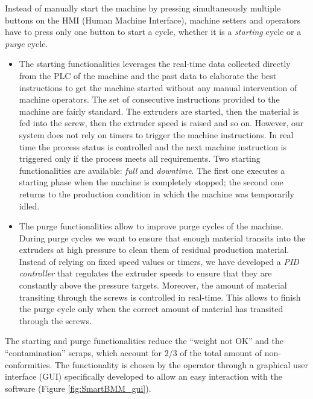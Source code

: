 Instead of manually start the machine by pressing simultaneously multiple buttons on the HMI (Human Machine Interface), machine setters and operators have to press only one button to start a cycle, whether it is a \textit{starting} cycle or a \textit{purge} cycle.  

\begin{itemize}
    \item The starting functionalities leverages the real-time data collected directly from the PLC of the machine and the past data to elaborate the best instructions to get the machine started without any manual intervention of machine operators. The set of consecutive instructions provided to the machine are fairly standard. The extruders are started, then the material is fed into the screw, then the extruder speed is raised and so on. However, our system does not rely on timers to trigger the machine instructions. In real time the process status is controlled and the next machine instruction is triggered only if the process meets all requirements.
    Two starting functionalities are available: \textit{full} and \textit{downtime}. The first one executes a starting phase when the machine is completely stopped; the second one returns to the production condition in which the machine was temporarily idled.
    \item The purge functionalities allow to improve purge cycles of the machine.
    During purge cycles we want to ensure that enough material transits into the extruders at high pressure to clean them of residual production material. Instead of relying on fixed speed values or timers, we have developed a \textit{PID controller} that regulates the extruder speeds to ensure that they are constantly above the pressure targets. Moreover, the amount of material transiting through the screws is controlled in real-time. This allows to finish the purge cycle only when the correct amount of material has transited through the screws.     
\end{itemize}
%
The starting and purge functionalities reduce the ``weight not OK'' and the ``contamination'' scraps, which account for $2/3$ of the total amount of non-conformities.
The functionality is chosen by the operator through a graphical user interface (GUI) specifically developed to allow an easy interaction with the software (Figure \ref{fig:SmartBMM_gui}).
